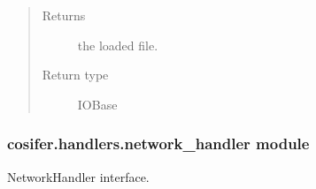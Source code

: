 \documentclass[letterpaper,10pt,english]{sphinxmanual}
\begin{document}
\begin{fulllineitems}
\begin{fulllineitems}
\begin{description}
\end{description}
\begin{quote}\begin{description}
\item[{Returns}] \leavevmode
the loaded file.

\item[{Return type}] \leavevmode
IOBase

\end{description}\end{quote}

\end{fulllineitems}


\end{fulllineitems}



\subsubsection{cosifer.handlers.network\_handler module}
\label{\detokenize{_modules/cosifer.handlers:module-cosifer.handlers.network_handler}}\label{\detokenize{_modules/cosifer.handlers:cosifer-handlers-network-handler-module}}
NetworkHandler interface.
\end{document}
